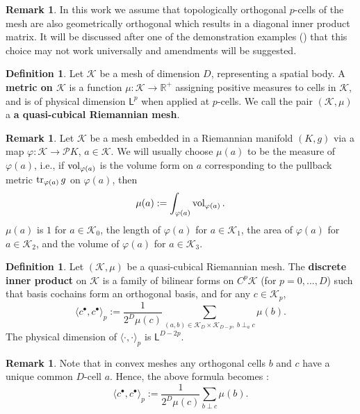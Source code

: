 \documentclass{elsarticle}
\theoremstyle{definition}
\newtheorem{definition}[theorem]{Definition}
\newtheorem{remark}[theorem]{Remark}
\newcommand{\inner}[2]{\langle#1,#2\rangle}
\newcommand{\tr}{\mathop{\rm tr}\nolimits}
\newcommand{\vol}{\mathop{\rm vol}\nolimits}
\newcommand{\R}{\mathbb{R}}
\newcommand{\newterm}[1]{\textbf{#1}}
\newcommand{\length}{\mathsf{L}}
\begin{document}
\begin{remark}
  In this work we assume that topologically orthogonal $p$-cells of the mesh are also geometrically orthogonal which results in a diagonal inner product matrix. It will be discussed after one of the demonstration examples () that this choice may not work universally and amendments will be suggested.
\end{remark}
\begin{definition}
  Let $\mathcal{K}$ be a mesh of dimension $D$, representing a spatial body.
  A \newterm{metric on $\mathcal{K}$} is a function
  $\mu \colon \mathcal{K} \to \R^+$ assigning positive measures to cells in $\mathcal{K}$, and is of physical dimension $\length^p$ when applied at $p$-cells.
  We call the pair $(\mathcal{K}, \mu)$ a \newterm{a quasi-cubical Riemannian mesh}.
\end{definition}
\begin{remark}
  Let $\mathcal{K}$ be a mesh embedded in a Riemannian manifold $(K, g)$ via a map $\varphi \colon \mathcal{K} \to \mathcal{P} K$, $a \in \mathcal{K}$.
  We will usually choose $\mu(a)$ to be the measure of $\varphi(a)$, i.e., if $\vol_{\varphi(a)}$ is the volume form on $a$ corresponding to the pullback metric $\tr_{\varphi(a)} g$ on $\varphi(a)$, then
  \begin{equation}
    \mu(a) := \int_{\varphi(a)} \vol_{\varphi(a)}.
  \end{equation}
  $\mu(a)$ is $1$ for $a \in \mathcal{K}_0$, the length of $\varphi(a)$ for $a \in \mathcal{K}_1$, the area of $\varphi(a)$ for $a \in \mathcal{K}_2$, and the volume of $\varphi(a)$ for $a \in \mathcal{K}_3$.
\end{remark}
\begin{definition}
  Let $(\mathcal{K}, \mu)$ be a quasi-cubical Riemannian mesh.
  The \newterm{discrete inner product} on $\mathcal{K}$ is a family of bilinear forms on $C^p\mathcal{K}$ (for $p = 0, ..., D$) such that basis cochains form an orthogonal basis,
  and for any $c \in \mathcal{K}_p$,
  \begin{equation}
    \inner{c^\bullet}{c^\bullet}_p :=
    \frac{1}{2^D \mu(c)} \sum_{(a, b) \in \mathcal{K}_D \times \mathcal{K}_{D - p},\ b \perp_a c} \mu(b).
  \end{equation}
  The physical dimension of $\inner{\cdot}{\cdot}_p$ is $\length^{D - 2 p}$.
\end{definition}
\begin{remark}
  Note that in convex meshes any orthogonal cells $b$ and $c$ have a unique common $D$-cell $a$.
  Hence, the above formula becomes \cite[Equation 2.90]{berbatov2023discrete}:
  \begin{equation}
    \inner{c^\bullet}{c^\bullet}_p :=
    \frac{1}{2^D \mu(c)} \sum_{b \perp c} \mu(b).
  \end{equation}
\end{remark}
\end{document}
